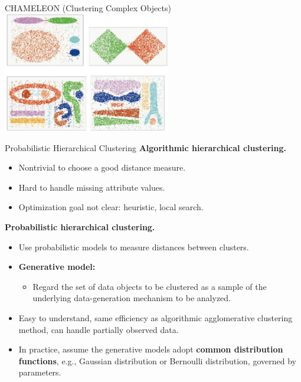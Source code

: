 \begin{frame}{CHAMELEON (Clustering Complex Objects)}
  \centering
  \includegraphics[width=0.55\textwidth]{img/cluster.jpeg}
\end{frame}

\begin{frame}{Probabilistic Hierarchical Clustering}
  \textbf{Algorithmic hierarchical clustering.}
  \begin{itemize}
  \item Nontrivial to choose a good distance measure.
  \item Hard to handle missing attribute values.
  \item Optimization goal not clear: heuristic, local search.
  \end{itemize}
  \textbf{Probabilistic hierarchical clustering.}
  \begin{itemize}
  \item Use probabilistic models to measure distances between
    clusters.
  \item \textbf{\color{airforceblue}Generative model:}
    \begin{itemize}
    \item Regard the set of data objects to be clustered as a
      sample of the underlying data-generation mechanism to be
      analyzed.
    \end{itemize}
  \item Easy to understand, same efficiency as algorithmic
    agglomerative clustering method, can handle partially observed data.
  \item In practice, assume the generative models adopt
    \textbf{\color{airforceblue}common distribution functions}, e.g.,
    Gaussian distribution or Bernoulli distribution, governed by
    parameters.
  \end{itemize}

\end{frame}

